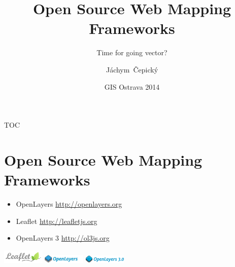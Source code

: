 \documentclass[xcolor=dvipsnames]{beamer}
\title{Open Source Web Mapping Frameworks}
\subtitle {Time for going vector?}
\author[J. Čepický] %
{Jáchym~Čepický\inst{1}}
\institute %
{
  \inst{1}%
  Geosense s.r.o.
  \url{http://geosense.cz}\\
}
\date[GIS Ostrava 2014] %
{GIS Ostrava 2014}
\begin{document}

\begin{frame}
  \titlepage
\end{frame}

\begin{frame}{TOC}
  \tableofcontents
\end{frame}





\section{Open Source Web Mapping Frameworks}
\begin{frame}
\begin{itemize}
    \item OpenLayers \url{http://openlayers.org}
    \item Leaflet \url{http://leafletjs.org}
    \item OpenLayers 3 \url{http://ol3js.org}
\end{itemize}
\begin{center}
    \includegraphics[width=2cm]{images/leaflet.png}
    \includegraphics[width=2cm]{images/openlayers.png}
    \includegraphics[width=2cm]{images/ol3.png}
\end{center}
\end{frame}
\end{document}
